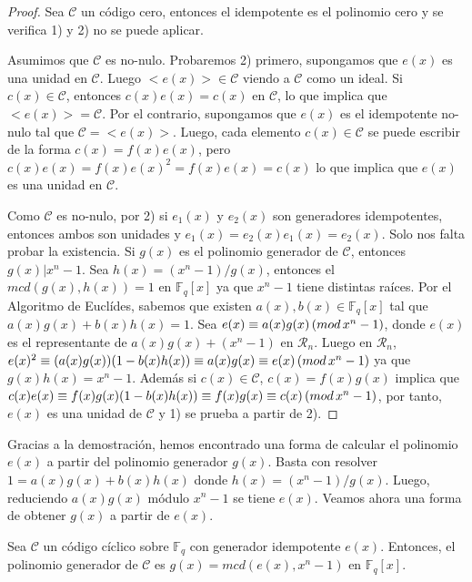 \begin{proof}
Sea $\mathcal{C}$ un código cero, entonces el idempotente es el polinomio cero y se verifica 1) y 2) no se puede aplicar.

Asumimos que $\mathcal{C}$ es no-nulo. Probaremos 2) primero, supongamos que $e(x)$ es una unidad en $\mathcal{C}$. Luego $<e(x)> \in \mathcal{C}$ viendo a $\mathcal{C}$ como un ideal. Si $c(x) \in \mathcal{C}$, entonces $c(x)e(x) = c(x)$ en $\mathcal{C}$, lo que implica que $<e(x)> = \mathcal{C}$. Por el contrario, supongamos que $e(x)$ es el idempotente no-nulo tal que $ \mathcal{C} = <e(x)> $. Luego, cada elemento $c(x) \in \mathcal{C}$ se puede escribir de la forma $c(x) = f(x)e(x)$, pero $c(x)e(x) = f(x)e(x)^2 = f(x)e(x) = c(x)$ lo que implica que $e(x)$ es una unidad en $\mathcal{C}$.

Como $\mathcal{C}$ es no-nulo, por 2) si $e_1(x)$ y $e_2(x)$ son generadores idempotentes, entonces ambos son unidades y $e_1(x) = e_2(x)e_1(x) = e_2(x)$. Solo nos falta probar la existencia. Si $g(x)$ es el polinomio generador de $\mathcal{C}$, entonces $g(x) | x^n-1$. Sea $h(x) = (x^n-1)/g(x)$, entonces el $mcd(g(x),h(x)) = 1$ en $\mathbb{F}_q[x]$ ya que $x^n-1$ tiene distintas raíces. Por el Algoritmo de Euclídes, sabemos que existen $a(x),b(x) \in \mathbb{F}_q[x]$ tal que $a(x)g(x) + b(x)h(x) = 1$. Sea $e(x) \equiv a(x)g(x) \thinspace (mod \thinspace x^n-1)$, donde $e(x)$ es el representante de $a(x)g(x) + (x^n-1)$ en $\mathcal{R}_n$. Luego en $\mathcal{R}_n$, $e(x)^2 \equiv (a(x)g(x))(1-b(x)h(x)) \equiv a(x)g(x) \equiv e(x) \thinspace (mod \thinspace x^n-1)$ ya que $g(x)h(x) = x^n-1$. Además si $c(x) \in \mathcal{C}$, $c(x) = f(x)g(x)$ implica que $c(x)e(x) \equiv f(x)g(x)(1-b(x)h(x)) \equiv f(x)g(x) \equiv c(x) \thinspace (mod \thinspace x^n-1)$, por tanto, $e(x)$ es una unidad de $\mathcal{C}$ y 1) se prueba a partir de 2).
\end{proof}

Gracias a la demostración, hemos encontrado una forma de calcular el polinomio $e(x)$ a partir del polinomio generador $g(x)$. Basta con resolver $1 = a(x)g(x) + b(x)h(x)$ donde $h(x) = (x^n-1)/g(x)$. Luego, reduciendo $a(x)g(x)$ módulo $x^n-1$ se tiene $e(x)$. Veamos ahora una forma de obtener $g(x)$ a partir de $e(x)$.

\begin{theorem}
Sea $\mathcal{C}$ un código cíclico sobre $\mathbb{F}_q$ con generador idempotente $e(x)$. Entonces, el polinomio generador de $\mathcal{C}$ es $g(x) = mcd(e(x),x^n-1)$ en $\mathbb{F}_q[x]$.
\end{theorem}

